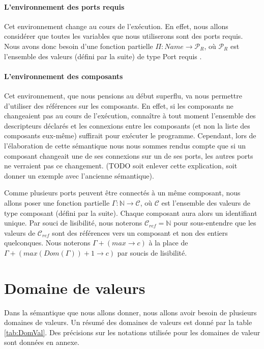 \documentclass[11pt,a4paper,fleqn]{report}
\newcommand{\C}{\mathcal{C}}
\newcommand{\Cref}{\mathcal{C}_{ref}}
\newcommand{\PR}{\mathcal{P}_R}
\begin{document}
\paragraph{L'environnement des ports requis}
Cet environnement change au cours de l'exécution. En effet, nous allons considérer que toutes les variables que nous utiliserons sont des ports requis. Nous avons donc besoin d'une fonction partielle $\Pi : Name \rightarrow \PR$, où $\PR$ est l'ensemble des valeurs (défini par la suite) de type Port requis .

\paragraph{L'environnement des composants}
Cet environnement, que nous pensions au début superflu, va nous permettre d'utiliser des références sur les composants. En effet, si les composants ne changeaient pas au cours de l'exécution,  connaître à tout moment l'ensemble des descripteurs déclarés et les connexions entre les composants (et non la liste des composants eux-même) suffirait pour exécuter le programme. Cependant, lors de l'élaboration de cette sémantique nous nous sommes rendus compte que si un composant changeait une de ses connexions sur un de ses ports, les autres ports ne verraient pas ce changement.
(TODO soit enlever cette explication, soit donner un exemple avec l'ancienne sémantique). 

Comme plusieurs ports peuvent être connectés à un même composant, nous allons poser une fonction partielle $\Gamma : \mathbb{N} \rightarrow \C$, où $\C$ est l'ensemble des valeurs de type composant (défini par la suite). Chaque composant aura alors un identifiant unique. Par souci de lisibilité, nous noterons $\Cref= \mathbb{N}$ pour sous-entendre que les valeurs de $\Cref$ sont des références vers un composant et non des entiers quelconques. Nous noterons $\Gamma + (max \rightarrow c)$ à la place de $\Gamma + (max(Dom(\Gamma)) + 1\rightarrow c)$ par soucis de lisibilité.





\section{Domaine de valeurs}
Dans la sémantique que nous allons donner, nous allons avoir besoin de plusieurs domaines de valeurs. Un résumé des domaines de valeurs est donné par la table \ref{tab:DomVal}. Des précisions sur les notations utilisée pour les domaines de valeur sont données en annexe.
\end{document}
